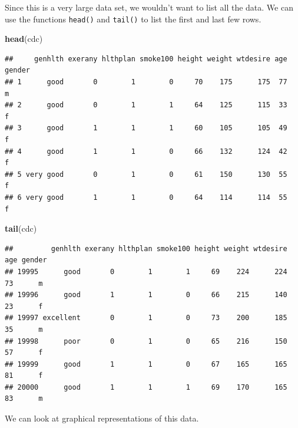 \documentclass[
]{book}
\newenvironment{Shaded}{\begin{snugshade}}{\end{snugshade}}
\newcommand{\KeywordTok}[1]{\textcolor[rgb]{0.13,0.29,0.53}{\textbf{#1}}}
\newcommand{\NormalTok}[1]{#1}
\newcommand{\OperatorTok}[1]{\textcolor[rgb]{0.81,0.36,0.00}{\textbf{#1}}}
\begin{document}
Since this is a very large data set, we wouldn't want to list all the data. We can use the functions \texttt{head()} and \texttt{tail()} to list the first and last few rows.

\begin{Shaded}
\begin{Highlighting}[]
\KeywordTok{head}\NormalTok{(cdc)}
\end{Highlighting}
\end{Shaded}

\begin{verbatim}
##     genhlth exerany hlthplan smoke100 height weight wtdesire age gender
## 1      good       0        1        0     70    175      175  77      m
## 2      good       0        1        1     64    125      115  33      f
## 3      good       1        1        1     60    105      105  49      f
## 4      good       1        1        0     66    132      124  42      f
## 5 very good       0        1        0     61    150      130  55      f
## 6 very good       1        1        0     64    114      114  55      f
\end{verbatim}

\begin{Shaded}
\begin{Highlighting}[]
\KeywordTok{tail}\NormalTok{(cdc)}
\end{Highlighting}
\end{Shaded}

\begin{verbatim}
##         genhlth exerany hlthplan smoke100 height weight wtdesire age gender
## 19995      good       0        1        1     69    224      224  73      m
## 19996      good       1        1        0     66    215      140  23      f
## 19997 excellent       0        1        0     73    200      185  35      m
## 19998      poor       0        1        0     65    216      150  57      f
## 19999      good       1        1        0     67    165      165  81      f
## 20000      good       1        1        1     69    170      165  83      m
\end{verbatim}

We can look at graphical representations of this data.

\begin{Shaded}
\end{Shaded}
\end{document}
